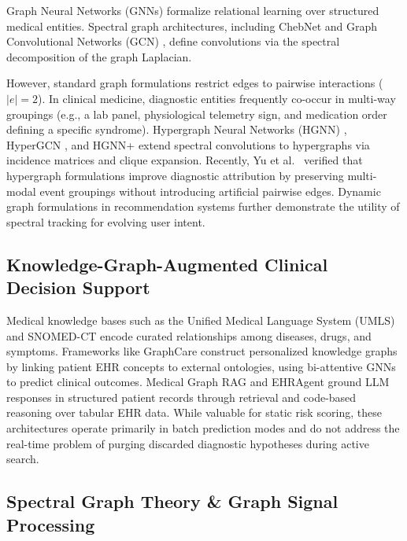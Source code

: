 \documentclass[10pt, onecolumn]{article}
\begin{document}
Graph Neural Networks (GNNs) \cite{zhou2020graph,battaglia2018relational} formalize relational learning over structured medical entities. Spectral graph architectures, including ChebNet \cite{defferrard2016convolutional} and Graph Convolutional Networks (GCN) \cite{kipf2017semi}, define convolutions via the spectral decomposition of the graph Laplacian.

However, standard graph formulations restrict edges to pairwise interactions ($|e|=2$). In clinical medicine, diagnostic entities frequently co-occur in multi-way groupings (e.g., a lab panel, physiological telemetry sign, and medication order defining a specific syndrome). Hypergraph Neural Networks (HGNN) \cite{feng2019hypergraph,zhou2006learning}, HyperGCN \cite{yadati2019hypergcn}, and HGNN+ \cite{gao2022hgnnplus} extend spectral convolutions to hypergraphs via incidence matrices and clique expansion. Recently, Yu et al.\ \cite{yu2025shy} verified that hypergraph formulations improve diagnostic attribution by preserving multi-modal event groupings without introducing artificial pairwise edges. Dynamic graph formulations in recommendation systems \cite{wu2019session} further demonstrate the utility of spectral tracking for evolving user intent.

\subsection{Knowledge-Graph-Augmented Clinical Decision Support}

Medical knowledge bases such as the Unified Medical Language System (UMLS) \cite{bodenreider2004unified} and SNOMED-CT encode curated relationships among diseases, drugs, and symptoms. Frameworks like GraphCare \cite{jiang2024graphcare} construct personalized knowledge graphs by linking patient EHR concepts to external ontologies, using bi-attentive GNNs to predict clinical outcomes. Medical Graph RAG \cite{wu2024medical} and EHRAgent \cite{eickhoff2024ehrrag} ground LLM responses in structured patient records through retrieval and code-based reasoning over tabular EHR data. While valuable for static risk scoring, these architectures operate primarily in batch prediction modes and do not address the real-time problem of purging discarded diagnostic hypotheses during active search.

\subsection{Spectral Graph Theory \& Graph Signal Processing}
\end{document}
